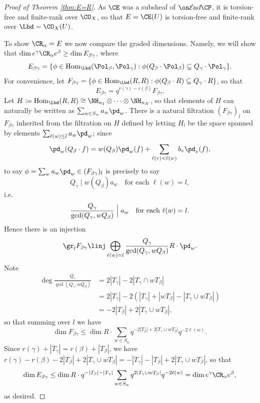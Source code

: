 \documentclass[11pt,reqno]{amsart}
\renewcommand{\te}[1]{\textrm{#1}}
\begin{document}
\begin{proof}[Proof of Theorem \ref{thm:E=R}]
    As $\CE$ was a subsheaf of $\shend\CP$, it is torsion-free and finite-rank over $\CO_X$, so that $E=\CE(U)$ is torsion-free and finite-rank over $\Lbd=\CO_X(U)$. 

    To show $\CR_\alpha=E$ we now compare the graded dimensions. Namely, we will show that $\dim e^\gamma \CR_\alpha e^\beta\ge \dim E_{\beta\gamma}$, where 
    \[E_{\beta\gamma}=\{\phi\in\hom_\Lbd(\Pol_\beta,\Pol_\gamma):\phi(Q_\beta\cdot\Pol_\beta)\subseteq Q_\gamma\cdot \Pol_\gamma\}.\] 
    For convenience, let $F_{\beta\gamma}=\{\phi\in\hom_\Lbd(R,R):\phi(Q_\beta\cdot R)\subseteq Q_\gamma\cdot R\}$, so that
    \[E_{\beta\gamma}=q^{r(\gamma)-r(\beta)}F_{\beta\gamma}.\] 
    Let $H\coloneqq \hom_\Lbd(R,R)\cong\NH_{n_1}\otimes\cdots\otimes\NH_{n_N}$, so that elements of $H$ can naturally be written as $\sum_{w\in S_\alpha}a_w\pd_w$. There is a natural filtration $(F_{\beta\gamma})_l$ on $F_{\beta\gamma}$ inherited from the filtration on $H$ defined by letting $H_l$ be the space spanned by elements $\sum_{\ell(w)\le l}a_w\pd_w$; since
    \[\pd_w (Q_\beta\cdot f) = w(Q_\beta)\pd_w(f)+\sum_{\ell(v)<\ell(w)}b_v\pd_v(f),\]
    to say $\phi=\sum_w a_w\pd_w\in(F_{\beta\gamma})_l$ is precisely to say
    \[Q_\gamma\mid w(Q_\beta) a_w\quad\te{for each }\ell(w)=l,\] 
    i.e. 
    \[\frac{Q_\gamma}{\gcd(Q_\gamma,w Q_\beta)}\Bigm| a_w\quad\te{for each }\ell(w)=l.\] 
    Hence there is an injection
    \[\gr_l F_{\beta\gamma} \linj \bigoplus_{\ell(w)=l} \frac{Q_\gamma}{\gcd(Q_\gamma,w Q_\beta)}R\cdot \pd_w.\] 
    Note 
    \begin{align*}
        \deg \frac{Q_\gamma}{\gcd(Q_\gamma,w Q_\beta)}&=2|T_\gamma|-2|T_\gamma\cap w T_\beta|\\
        &=2|T_\gamma|-2(|T_\gamma|+|wT_\beta|-|T_\gamma\cup wT_\beta|)\\
        &=-2|T_\beta|+2|T_\gamma\cup wT_\beta|,
    \end{align*}
    so that summing over $l$ we have
    \[\dim F_{\beta\gamma}\le \dim R\cdot \sum_{w\in S_\alpha} q^{-2|T_\beta|+2|T_\gamma\cup wT_\beta|}q^{-2\ell(w)}.\]
    Since $r(\gamma)+|T_\gamma|=r(\beta)+|T_\beta|$, we have $r(\gamma)-r(\beta)-2|T_\beta|+2|T_\gamma\cup wT_\beta|=-|T_\gamma|-|T_\beta|+2|T_\gamma\cup wT_\beta|$, so that
    \[\dim E_{\beta\gamma}\le \dim R\cdot q^{-|T_\beta|-|T_\gamma|}\sum_{w\in S_\alpha} q^{2|T_\gamma\cup w T_\beta|}q^{-2\ell(w)}=\dim e^\gamma \CR_\alpha e^\beta,\] 
    as desired.


\end{proof}
\end{document}
